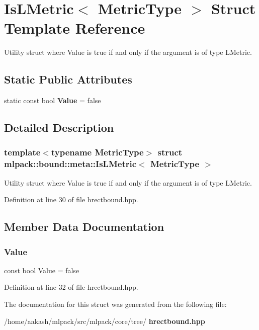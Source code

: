 \section{Is\+L\+Metric$<$ Metric\+Type $>$ Struct Template Reference}
\label{structmlpack_1_1bound_1_1meta_1_1IsLMetric}


Utility struct where Value is true if and only if the argument is of type L\+Metric.  


\subsection*{Static Public Attributes}
\begin{DoxyCompactItemize}
\item 
static const bool \textbf{ Value} = false
\end{DoxyCompactItemize}


\subsection{Detailed Description}
\subsubsection*{template$<$typename Metric\+Type$>$\newline
struct mlpack\+::bound\+::meta\+::\+Is\+L\+Metric$<$ Metric\+Type $>$}

Utility struct where Value is true if and only if the argument is of type L\+Metric. 



Definition at line 30 of file hrectbound.\+hpp.



\subsection{Member Data Documentation}
\mbox{\label{structmlpack_1_1bound_1_1meta_1_1IsLMetric_a2cbb7037a76934614ab6ca3cc713d6ef}} 
\subsubsection{Value}
{\footnotesize\ttfamily const bool Value = false\hspace{0.3cm}{\ttfamily [static]}}



Definition at line 32 of file hrectbound.\+hpp.



The documentation for this struct was generated from the following file\+:\begin{DoxyCompactItemize}
\item 
/home/aakash/mlpack/src/mlpack/core/tree/\textbf{ hrectbound.\+hpp}\end{DoxyCompactItemize}
